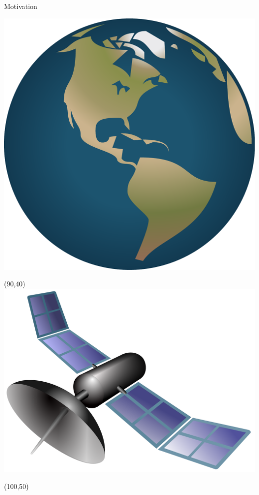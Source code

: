\documentclass{beamer}
\begin{document}
\begin{frame}[t]{Motivation}
\begin{textblock}{20}
	\includegraphics[width=1\linewidth]{globe}
\end{textblock}
\begin{textblock}{10}(90,40)
	\includegraphics[width=1\linewidth]{satellite}
\end{textblock}
\begin{textblock}{10}(100,50)

\end{textblock}
\end{frame}
\end{document}
